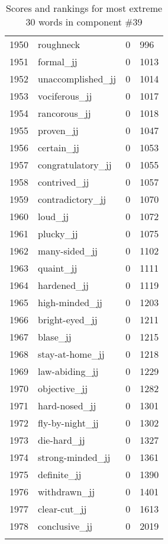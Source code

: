 \begin{longtable}[!htbp]{| rlr@{.}l |}
    1950 & roughneck & 0 & 996 \\
    1951 & formal\_jj & 0 & 1013 \\
    1952 & unaccomplished\_jj & 0 & 1014 \\
    1953 & vociferous\_jj & 0 & 1017 \\
    1954 & rancorous\_jj & 0 & 1018 \\
    1955 & proven\_jj & 0 & 1047 \\
    1956 & certain\_jj & 0 & 1053 \\
    1957 & congratulatory\_jj & 0 & 1055 \\
    1958 & contrived\_jj & 0 & 1057 \\
    1959 & contradictory\_jj & 0 & 1070 \\
    1960 & loud\_jj & 0 & 1072 \\
    1961 & plucky\_jj & 0 & 1075 \\
    1962 & many-sided\_jj & 0 & 1102 \\
    1963 & quaint\_jj & 0 & 1111 \\
    1964 & hardened\_jj & 0 & 1119 \\
    1965 & high-minded\_jj & 0 & 1203 \\
    1966 & bright-eyed\_jj & 0 & 1211 \\
    1967 & blase\_jj & 0 & 1215 \\
    1968 & stay-at-home\_jj & 0 & 1218 \\
    1969 & law-abiding\_jj & 0 & 1229 \\
    1970 & objective\_jj & 0 & 1282 \\
    1971 & hard-nosed\_jj & 0 & 1301 \\
    1972 & fly-by-night\_jj & 0 & 1302 \\
    1973 & die-hard\_jj & 0 & 1327 \\
    1974 & strong-minded\_jj & 0 & 1361 \\
    1975 & definite\_jj & 0 & 1390 \\
    1976 & withdrawn\_jj & 0 & 1401 \\
    1977 & clear-cut\_jj & 0 & 1613 \\
    1978 & conclusive\_jj & 0 & 2019 \\
    \hline
    \caption{Scores and rankings for most extreme 30 words in component \#39} \\
\end{longtable}
